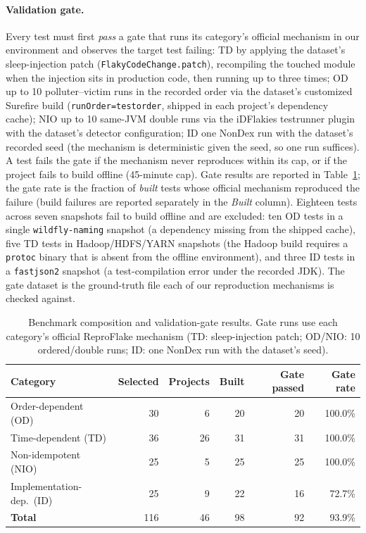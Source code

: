 \paragraph{Validation gate.} Every test must first \emph{pass} a gate that
runs its category's official mechanism in our environment and observes the
target test failing: TD by applying the dataset's sleep-injection patch (\texttt{FlakyCodeChange.patch}), recompiling the touched module when the
injection sits in production code, then running up to three times; OD up to 10
polluter--victim runs in the recorded order via the dataset's customized
Surefire build (\texttt{runOrder=testorder}, shipped in each project's
dependency cache); NIO up to 10 same-JVM double
runs via the iDFlakies testrunner plugin with the dataset's detector
configuration; ID one NonDex run with the dataset's recorded seed (the
mechanism is deterministic given the seed, so one run suffices). A test
fails the gate if the mechanism never reproduces within its cap, or if the
project fails to build offline (45-minute cap). Gate results are reported in
Table~\ref{tab:benchmark}; the gate rate is the fraction of \emph{built} tests
whose official mechanism reproduced the failure (build failures are reported
separately in the \emph{Built} column). Eighteen tests across seven snapshots
fail to build offline and are excluded: ten OD tests in a single
\texttt{wildfly-naming} snapshot (a dependency missing from the shipped cache),
five TD tests in Hadoop/HDFS/YARN snapshots (the Hadoop build requires a
\texttt{protoc} binary that is absent from the offline environment), and three
ID tests in a \texttt{fastjson2} snapshot (a test-compilation error under the
recorded JDK). The gate dataset is the ground-truth file each of our
reproduction mechanisms is checked against.

\begin{table}[t]
\caption{Benchmark composition and validation-gate results. Gate runs use
each category's official ReproFlake mechanism (TD: sleep-injection patch;
OD/NIO: 10 ordered/double runs; ID: one NonDex run with the dataset's seed).}
\label{tab:benchmark}
\small
\begin{tabular}{@{}lrrrrr@{}}
\toprule
\textbf{Category} & \textbf{Selected} & \textbf{Projects} & \textbf{Built} &
\textbf{Gate passed} & \textbf{Gate rate}\\
\midrule
Order-dependent (OD) & 30 & 6 & 20 & 20 & 100.0\%\\
Time-dependent (TD) & 36 & 26 & 31 & 31 & 100.0\%\\
Non-idempotent (NIO) & 25 & 5 & 25 & 25 & 100.0\%\\
Implementation-dep.\ (ID) & 25 & 9 & 22 & 16 & 72.7\%\\
\midrule
\textbf{Total} & 116 & 46 & 98 & 92 & 93.9\%\\
\bottomrule
\end{tabular}
\end{table}

